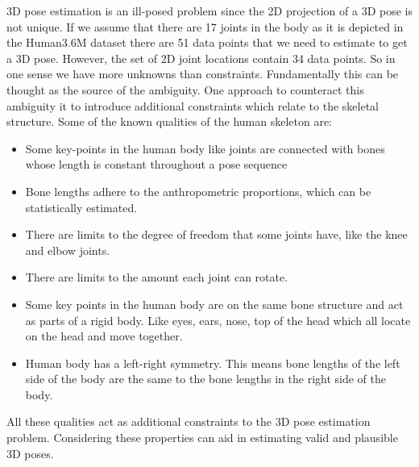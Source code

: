 3D pose estimation is an ill-posed problem since the 2D projection of a 3D pose is not unique. If we assume that there are 17 joints in the body as it is depicted in the Human3.6M dataset \parencite{ionescu2014human3} there are 51 data points that we need to estimate to get a 3D pose. However, the set of 2D joint locations contain 34 data points. So in one sense we have more unknowns than constraints. Fundamentally this can be thought as the source of the ambiguity. One approach to counteract this ambiguity it to introduce additional constraints which relate to the skeletal structure. Some of the known qualities of the human skeleton are:
\begin{itemize}
    \item Some key-points in the human body like joints are connected with bones whose length is constant throughout a pose sequence
    \item Bone lengths adhere to the anthropometric proportions, which can be statistically estimated.
    \item There are limits to the degree of freedom that some joints have, like the knee and elbow joints.
    \item There are limits to the amount each joint can rotate.
    \item Some key points in the human body are on the same bone structure and act as parts of a rigid body. Like eyes, ears, nose, top of the head which all locate on the head and move together.
    \item Human body has a left-right symmetry. This means bone lengths of the left side of the body are the same to the bone lengths in the right side of the body.
\end{itemize}

All these qualities act as additional constraints to the 3D pose estimation problem. Considering these properties can aid in estimating valid and plausible 3D poses.

